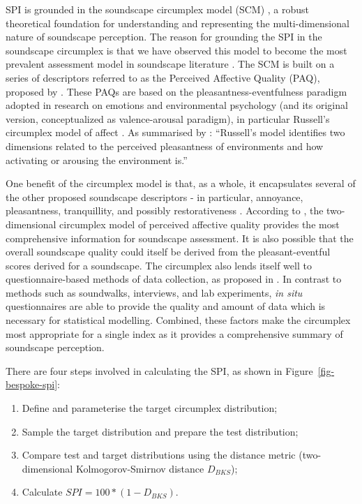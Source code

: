 \documentclass[
  authoryear,
  3p]{elsarticle}
\providecommand{\tightlist}{%
  \setlength{\itemsep}{0pt}\setlength{\parskip}{0pt}}\usepackage{longtable,booktabs,array}
\begin{document}
SPI is grounded in the soundscape circumplex model (SCM)
\citep{Axelsson2010principal, Axelsson2012Swedish}, a robust theoretical
foundation for understanding and representing the multi-dimensional
nature of soundscape perception. The reason for grounding the SPI in the
soundscape circumplex is that we have observed this model to become the
most prevalent assessment model in soundscape literature
\citep{Aletta2023Adoption}. The SCM is built on a series of descriptors
referred to as the Perceived Affective Quality (PAQ), proposed by
\citep{Axelsson2010principal}. These PAQs are based on the
pleasantness-eventfulness paradigm adopted in research on emotions and
environmental psychology (and its original version, conceptualized as
valence-arousal paradigm), in particular Russell's circumplex model of
affect \citep{Russell1980circumplex}. As summarised by
\citet{Axelsson2010principal}: ``Russell's model identifies two
dimensions related to the perceived pleasantness of environments and how
activating or arousing the environment is.''

One benefit of the circumplex model is that, as a whole, it encapsulates
several of the other proposed soundscape descriptors - in particular,
annoyance, pleasantness, tranquillity, and possibly restorativeness
\citep{Aletta2016Soundscape}. According to \citet{Axelsson2015How}, the
two-dimensional circumplex model of perceived affective quality provides
the most comprehensive information for soundscape assessment. It is also
possible that the overall soundscape quality could itself be derived
from the pleasant-eventful scores derived for a soundscape. The
circumplex also lends itself well to questionnaire-based methods of data
collection, as proposed in \citet{ISO12913Part2}. In contrast to methods
such as soundwalks, interviews, and lab experiments, \emph{in situ}
questionnaires are able to provide the quality and amount of data which
is necessary for statistical modelling. Combined, these factors make the
circumplex most appropriate for a single index as it provides a
comprehensive summary of soundscape perception.

There are four steps involved in calculating the SPI, as shown in
Figure~\ref{fig-bespoke-spi}:

\begin{enumerate}
\def\labelenumi{\arabic{enumi}.}
\tightlist
\item
  Define and parameterise the target circumplex distribution;
\item
  Sample the target distribution and prepare the test distribution;
\item
  Compare test and target distributions using the distance metric
  (two-dimensional Kolmogorov-Smirnov distance \(D_{BKS}\));
\item
  Calculate \(SPI = 100 * (1 - D_{BKS})\).
\end{enumerate}
\end{document}
